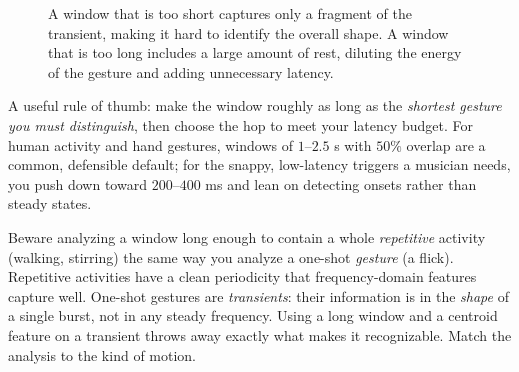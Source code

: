 \begin{figure}[H]
\centering
{}
\caption{A window that is too short captures only a fragment of the transient, making it hard to identify the overall shape. A window that is too long includes a large amount of rest, diluting the energy of the gesture and adding unnecessary latency.}
\label{ch38:fig-window-length}
\end{figure}

A useful rule of thumb: make the window roughly as long as the \emph{shortest
gesture you must distinguish}, then choose the hop to meet your latency budget.
For human activity and hand gestures, windows of $1$--$2.5$ s with $50\%$ overlap
are a common, defensible default; for the snappy, low-latency triggers a musician
needs, you push down toward $200$--$400$ ms and lean on detecting onsets rather
than steady states.

\begin{trapbox}
Beware analyzing a window long enough to contain a whole \emph{repetitive}
activity (walking, stirring) the same way you analyze a one-shot
\emph{gesture} (a flick). Repetitive activities have a clean periodicity that
frequency-domain features capture well. One-shot gestures are
\emph{transients}: their information is in the \emph{shape} of a single burst, not
in any steady frequency. Using a long window and a centroid feature on a transient
throws away exactly what makes it recognizable. Match the analysis to the kind of
motion.
\end{trapbox}

